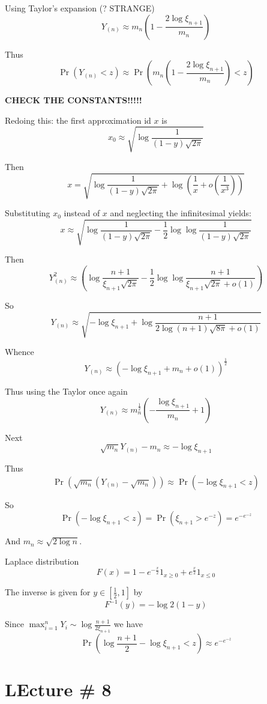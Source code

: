 \documentclass[a4paper]{article}
\newcommand{\clo}[1]{{\left [ #1 \right ]}}
\newcommand{\brac}[1]{{\left ( #1 \right )}}
\begin{document}
Using Taylor's expansion (? STRANGE)
\[Y_{(n)} \approx m_n\brac{ 1 - \frac{2\log \xi_{n+1}}{m_n} }\]

Thus 
\[\Pr\brac{ Y_{(n)} < z } \approx \Pr\brac{ m_n\brac{ 1 - \frac{2\log \xi_{n+1}}{m_n} } < z } \]


\textbf{CHECK THE CONSTANTS!!!!!}

Redoing this: the first approximation id $x$ is
\[x_0 \approx \sqrt{ \log\frac{1}{(1-y)\sqrt{2\pi}} }\]

Then 
\[x = \sqrt{ \log\frac{1}{(1-y)\sqrt{2\pi}} + \log\brac{ \frac{1}{x} + o(\frac{1}{x^3}) }}\]

Substituting $x_0$ instead of $x$ and neglecting the infinitesimal yields:
\[ x \approx \sqrt{ \log\frac{1}{(1-y)\sqrt{2\pi}} - \frac{1}{2} \log\log\frac{1}{(1-y)\sqrt{2\pi}} }\]

Then 
\[ Y_{(n)}^2 \approx \brac{
\log\frac{n+1}{\xi_{n+1}\sqrt{2\pi}}
- \frac{1}{2} \log\log\frac{n+1}{\xi_{n+1}\sqrt{2\pi} + o(1)}
}\]

So
\[ Y_{(n)} \approx \sqrt{ - \log \xi_{n+1} + \log\frac{n+1}{2\log{(n+1)} \sqrt{8\pi} + o(1) } }\]

Whence
\[ Y_{(n)} \approx \brac{-\log \xi_{n+1} + m_n + o(1) }^\frac{1}{2}\]

Thus using the Taylor once again
\[ Y_{(n)} \approx m_n^\frac{1}{2} \brac{-\frac{\log \xi_{n+1}}{m_n} + 1 }\]

Next 
\[ \sqrt{m_n} Y_{(n)} - m_n\approx - \log \xi_{n+1}\]

Thus
\[ \Pr\brac{\sqrt{m_n} \brac{Y_{(n)} - \sqrt{m_n}}} \approx \Pr\brac{- \log \xi_{n+1} < z }\]

So
\[\Pr\brac{- \log \xi_{n+1} < z } = \Pr\brac{\xi_{n+1} > e^{-z} } = e^{-e^{-z}}\]

And $m_n\approx \sqrt{ 2 \log n}$.


Laplace distribution
\[F(x) = 1-e^{-\frac{x}{2}} 1_{x\geq 0} + e^{\frac{x}{2}} 1_{x\leq 0}\]

The inverse is given for $y\in \clo{\frac{1}{2},1}$ by
\[ F^{-1}(y) = - \log 2(1-y)\]

Since $\max_{i=1}^n Y_i \sim \log\frac{n+1}{2\xi_{n+1}}$ 
we have
\[\Pr\brac{ \log\frac{n+1}{2} - \log \xi_{n+1} < z } \approx e^{-e^{-z}}\]



\section{LEcture \# 8} %
\label{sec:lecture_8}
\end{document}
